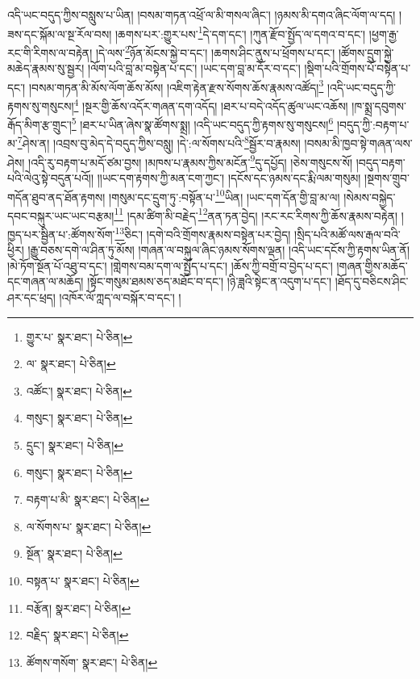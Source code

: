 འདི་ཡང་བདུད་ཀྱིས་བསླུས་པ་ཡིན། །བསམ་གཏན་འཕྲོ་ལ་མི་གསལ་ཞིང་། །ཉམས་མི་དགའ་ཞིང་ལོག་ལ་དད། །ཟས་དང་སྐོམ་ལ་སྔ་རོལ་བས། །ཆགས་པར་:གྱུར་པས་\footnote{གྱུར་པ་  སྣར་ཐང་།  པེ་ཅིན། }དེ་དག་དང་། །ཀུན་རྫོབ་སྤྱོད་ལ་དགའ་བ་དང་། །ཕྱག་རྒྱ་རང་གི་རིགས་ལ་བརྟེན། །དེ་ལས་\footnote{ལ་  སྣར་ཐང་།  པེ་ཅིན། }ཉོན་མོངས་སྐྱེ་བ་དང་། །ཆགས་ཤིང་ནུས་པ་ཕྲོགས་པ་དང་། །ཚོགས་དྲུག་སྐྱེ་མཆེད་རྣམས་སུ་སྦྱར། །ལོག་པའི་བླ་མ་བསྟེན་པ་དང་། །ཡང་དག་བླ་མ་དོར་བ་དང་། །སྡིག་པའི་གྲོགས་པོ་བསྟེན་པ་དང་། །བསམ་གཏན་མི་མོས་ལོག་ཆོས་མོས། །འཇིག་རྟེན་རྫས་སོགས་ཆོས་རྣམས་འཚོད།\footnote{འཚོང་།  སྣར་ཐང་།  པེ་ཅིན། } །འདི་ཡང་བདུད་ཀྱི་རྟགས་སུ་གསུངས།\footnote{གསུང་།  སྣར་ཐང་།  པེ་ཅིན། } །སྔར་གྱི་ཆོས་འདོར་གཞན་དག་འདོད། །ཐར་པ་བདེ་འདོད་ཚུལ་ཡང་འཆོས། །ཁ་སྨྲ་དབུགས་རྒོད་མིག་རྩ་གྲུང་།\footnote{དྲུང་།  སྣར་ཐང་།  པེ་ཅིན། } །ཐར་པ་ཡིན་ཞེས་སྣ་ཚོགས་སྨྲ། །འདི་ཡང་བདུད་ཀྱི་རྟགས་སུ་གསུངས།\footnote{གསུང་།  སྣར་ཐང་།  པེ་ཅིན། } །བདུད་ཀྱི་:བརྟག་པ་མ་\footnote{བརྟག་པ་མི་  སྣར་ཐང་།  པེ་ཅིན། }ཤེས་ན། །འབྲས་བུ་མེད་དེ་བདུད་ཀྱིས་བསླུ། །དེ་:ལ་སོགས་པའི་\footnote{ལ་སོགས་པ་  སྣར་ཐང་།  པེ་ཅིན། }སྦྱོར་བ་རྣམས། །བསམ་མི་ཁྱབ་སྟེ་གཞན་ལས་ཤེས། །འདི་རུ་བརྟག་པ་མདོ་ཙམ་བྱས། །མཁས་པ་རྣམས་ཀྱིས་མངོན་\footnote{སྔོན་  སྣར་ཐང་།  པེ་ཅིན། }དུ་དཔྱོད། །ཅེས་གསུངས་སོ། །བདུད་བརྟག་པའི་ལེའུ་སྟེ་བདུན་པའོ།། །།ཡང་དག་རྟགས་ཀྱི་མན་ངག་ཀྱང་། །དངོས་དང་ཉམས་དང་རྨི་ལམ་གསུམ། །སྔགས་གྲུབ་གདོན་ཐུབ་ནད་ཐོན་རྟགས། །གསུམ་དང་དྲུག་ཏུ་:བསྟོན་པ་\footnote{བསྟན་པ་  སྣར་ཐང་།  པེ་ཅིན། }ཡིན། །ཡང་དག་དོན་གྱི་བླ་མ་ལ། །སེམས་བསྐྱེད་དབང་བསྐུར་ཡང་ཡང་བརྩམ།\footnote{བརྩོན།  སྣར་ཐང་།  པེ་ཅིན། } །དམ་ཚིག་མི་བརྗེད་\footnote{བརྗིད་  སྣར་ཐང་།  པེ་ཅིན། }ནན་ཏན་བྱེད། །རང་རང་རིགས་ཀྱི་ཆོས་རྣམས་བརྟེན། །ཁྱད་པར་སྦྱིན་པ་:ཚོགས་སོག་\footnote{ཚོགས་གསོག་  སྣར་ཐང་།  པེ་ཅིན། }ཅིང་། །དགེ་བའི་གྲོགས་རྣམས་བསྟེན་པར་བྱེད། །སྲིད་པའི་མཚོ་ལས་རྒལ་བའི་ཕྱིར། །རྒྱུ་བཅས་དགེ་ལ་ཤིན་ཏུ་མོས། །གཞན་ལ་བསྐུལ་ཞིང་ཉམས་སོགས་ལྡན། །འདི་ཡང་དངོས་ཀྱི་རྟགས་ཡིན་ནོ། །མེ་ཏོག་སྔོན་པོ་འཐུ་བ་དང་། །གླེགས་བམ་དག་ལ་སྤྱོད་པ་དང་། །ཆོས་ཀྱི་བགྲོ་བ་བྱེད་པ་དང་། །གཞན་གྱིས་མཆོད་དང་གཞན་ལ་མཆོད། །སྟོང་གསུམ་ཐམས་ཅད་མཐོང་བ་དང་། །ཉི་ཟླའི་སྟེང་ན་འདུག་པ་དང་། །ཐོད་དུ་བཅིངས་ཤིང་ཤར་དང་ཕྲད། །འཁོར་ལོ་ཀླད་ལ་བསྐོར་བ་དང་། །
